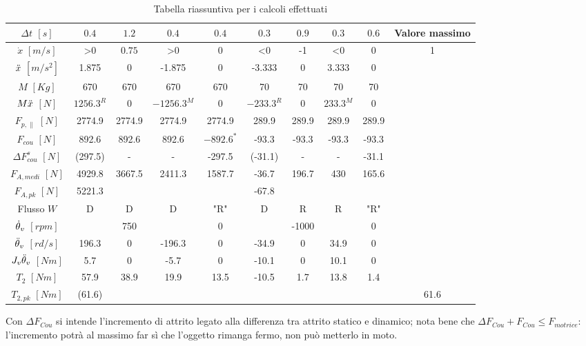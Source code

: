 \begin{table}[h]
\centering
    \begin{tabular}{c|c|c|c|c|c|c|c|c|c}
    \hline
    $\Delta t$ $[s]$ & $0.4$ & $1.2$ & $0.4$ & $0.4$ & $0.3$ & $0.9$ & $0.3$ & $0.6$ & Valore massimo \\ \hline
    $\dot x$ $[m/s]$ & >0 & \(0.75\) & >0 & 0 & <0 & -1 & <0 & 0 & 1 \\ \cline{1-1}
    $\Ddot x$ $[m/s^2]$ & 1.875 & 0 & -1.875 & 0 & -3.333 & 0 & 3.333 & 0 &  \\ \cline{1-1}
    $M$ $[Kg]$ & 670 & 670 & 670 & 670 & 70 & 70 & 70 & 70 &  \\ \cline{1-1}
    \hline
    $M \Ddot x$ $[N]$ & \(1256.3^R\) & 0 & \(-1256.3^M\) & 0 & \(-233.3^R\) & 0 & \(233.3^M\) & 0 &  \\ \cline{1-1}
    $F_{p,\parallel}$ $[N]$ & 2774.9 & 2774.9 & 2774.9 & 2774.9 & 289.9 & 289.9 & 289.9 & 289.9 &  \\ \cline{1-1}
    $F_{cou}$ $[N]$ & 892.6 & 892.6 & 892.6 & \(-892.6^*\) & -93.3 & -93.3 & -93.3 & -93.3 &  \\ \cline{1-1}
    $\Delta F_{cou}^s$ $[N]$ & (297.5) & - & - & -297.5 & (-31.1) & - & - & -31.1 &  \\ \cline{1-1}
    \hline
    $F_{A,medi}$ $[N]$ & 4929.8 & 3667.5 & 2411.3 & 1587.7 & -36.7 & 196.7 & 430 & 165.6 &  \\ \cline{1-1}
    $F_{A,pk}$ $[N]$ & 5221.3 &  &  &  & -67.8 &  &  &  &  \\ \cline{1-1}
    Flusso $W$ & D & D & D & "R" & D & R & R & "R" &  \\ \cline{1-1}
    \hline
    $\dot{\theta}_v$ $[rpm]$ &  & 750 &  & 0 &  & -1000 &  & 0 &  \\ \cline{1-1}
    $\Ddot{\theta}_v$ $[rd/s]$ & 196.3 & 0 & -196.3 & 0 & -34.9 & 0 & 34.9 & 0 &  \\ \cline{1-1}
    \hline
    $J_v\Ddot{\theta}_v$ $[Nm]$  & 5.7 & 0 & -5.7 & 0 & -10.1 & 0 & 10.1 & 0 &  \\ \cline{1-1}
    $T_2$ $[Nm]$ & 57.9 & 38.9 & 19.9 & 13.5 & -10.5 & 1.7 & 13.8 & 1.4 &  \\ \cline{1-1}
    $T_{2,pk}$ $[Nm]$ & (61.6) &  &  &  &  &  &  &  & 61.6 \\ \cline{1-1}
    \hline
    \end{tabular}
    \caption{Tabella riassuntiva per i calcoli effettuati}
\end{table}

Con $\Delta F_{Cou}$ si intende l'incremento di attrito legato alla differenza tra attrito statico e dinamico; nota bene che $\Delta F_{Cou} + F_{Cou} \leqslant F_{motrice}$: l'incremento potrà al massimo far sì che l'oggetto rimanga fermo, non può metterlo in moto.

